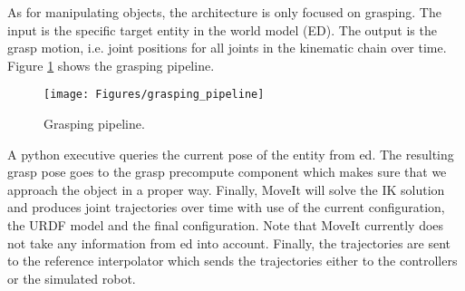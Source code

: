 As for manipulating objects, the architecture is only focused on grasping. The input is the specific target entity in the world model (ED). The output is the grasp motion, i.e. joint positions for all joints in the kinematic chain over time. Figure \ref{fig:grasping_pipeline} shows the grasping pipeline.
\begin{figure}[ht]
	\texttt{[image: Figures/grasping\_pipeline]}
	\caption{Grasping pipeline.}
	\label{fig:grasping_pipeline}
\end{figure}
A python executive queries the current pose of the entity from \acrshort{ed}. The resulting grasp pose goes to the grasp precompute component which makes sure that we approach the object in a proper way. Finally, MoveIt will solve the IK solution and produces joint trajectories over time with use of the current configuration, the URDF model and the final configuration. Note that MoveIt currently does not take any information from \acrshort{ed} into account. Finally, the trajectories are sent to the reference interpolator which sends the trajectories either to the controllers or the simulated robot. 